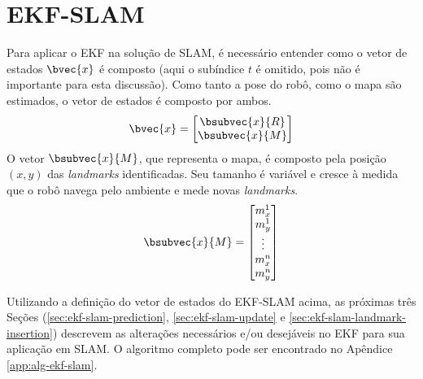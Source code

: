 \section{EKF-SLAM}
Para aplicar o EKF na solução de SLAM, é necessário entender 
como o vetor de estados $\bvec{x}$ é composto (aqui o subíndice $t$ é omitido, pois não é importante para esta discussão). Como tanto a pose do 
robô, como o mapa são estimados, o vetor de estados é composto por ambos. 
\begin{equation}
  \bvec{x} = \begin{bmatrix}
    \bsubvec{x}{R} \\
    \bsubvec{x}{M}
  \end{bmatrix}
  \label{eq:slam-state-vector}
\end{equation}
O vetor $\bsubvec{x}{M}$, que representa o mapa, é composto pela posição $(x, y)$ das \textit{landmarks} identificadas. 
Seu tamanho é variável e cresce à medida que o robô navega pelo ambiente e 
mede novas \textit{landmarks}.
\begin{equation}
  \bsubvec{x}{M} = \begin{bmatrix}
    m_x^1\\
    m_y^1\\
    \vdots\\
    m_x^n\\
    m_y^n
  \end{bmatrix}
  \label{eq:feature-map}
\end{equation}

Utilizando a definição do vetor de estados do EKF-SLAM acima, as próximas três Seções (\ref{sec:ekf-slam-prediction}, \ref{sec:ekf-slam-update} e \ref{sec:ekf-slam-landmark-insertion}) descrevem as alterações necessários e/ou desejáveis no EKF para sua aplicação em SLAM. O algoritmo completo pode ser encontrado no Apêndice \ref{app:alg-ekf-slam}.

